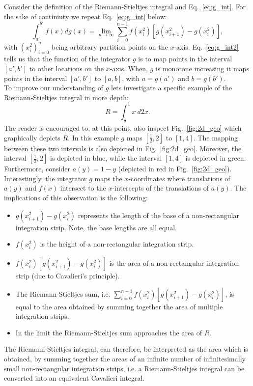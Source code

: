 \documentclass{article}
\theoremstyle{theorem}
\theoremstyle{definition}
\begin{document}
Consider the definition of the Riemann-Stieltjes integral and 
Eq.~\eqref{eq:g_int}. For the sake of continiuty we repeat Eq.~\eqref{eq:g_int} below:
\begin{equation}
\label{eq:g_int2}
\int_{a'}^{b'} f(x) dg(x) =  \lim_{n \rightarrow \infty}\sum_{i=0}^{n-1} f(x_i^2)[g(x_{i+1}^2)-g(x_{i}^2)], 
\end{equation}
with $(x_i^2)_{i=0}^n$ being arbitrary partition points on the $x$-axis.
Eq.~\eqref{eq:g_int2} tells us that the function of the integrator $g$ is to map points in the interval $[a',b']$ to other 
locations on the $x$-axis. When, $g$ is monotone increasing it maps points in the interval $[a',b']$ to $[a,b]$,
with $a = g(a')$ and $b = g(b')$.\\

\noindent
To improve our understanding of $g$ lets investigate a specific example of the Riemann-Stieltjes integral in more depth: 
\begin{equation}
R = \int_{\frac{1}{2}}^1 x~d2x. 
\end{equation}
The reader is encouraged to, at this point, also inspect Fig.~\ref{fig:2d_geo} which graphically depicts $R$. 
In this example $g$ maps $[\frac{1}{2},2]$ to $[1,4]$. The mapping between these two intervals is also 
depicted in Fig.~\ref{fig:2d_geo}. Moreover, the interval $[\frac{1}{2},2]$ is depicted in blue,
while the interval $[1,4]$ is depicted in green.\\ 

\noindent
Furthermore, consider $a(y) = 1-y$ (depicted in red in Fig.~\ref{fig:2d_geo}). Interestingly, the integrator $g$ maps the $x$-coordinates where translations of $a(y)$ and $f(x)$ intersect to the $x$-intercepts of the translations of $a(y)$.
The implications of this observation is the following: 
\begin{itemize}
 \item $g(x_{i+1}^2)-g(x_{i}^2)$ represents the length of the base of a non-rectangular integration strip. Note, the base lengths are all equal.
 \item $f(x_i^2)$ is the height of a non-rectangular integration strip.
 \item $f(x_i^2)[g(x_{i+1}^2)-g(x_{i}^2)]$ is the area of a non-rectangular integration strip (due to Cavalieri's principle).
 \item The Riemann-Stieltjes sum, i.e. $\sum_{i=0}^{n-1} f(x_i^2)[g(x_{i+1}^2)-g(x_{i}^2)]$, is equal to the area obtained by summing together the area of multiple 
 integration strips.
 \item In the limit the Riemann-Stieltjes sum approaches the area of $R$. 
\end{itemize}
The Riemann-Stieltjes integral, can therefore, be interpreted as the area which is obtained, by summing together the areas of an infinite number of infinitesimally small non-rectangular integration strips,
i.e. a Riemann-Stieltjes integral can be converted into an equivalent Cavalieri integral.\\
\end{document}
